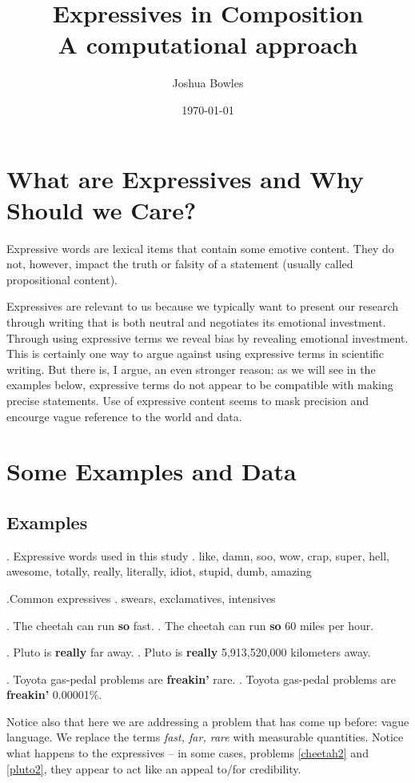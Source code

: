 \documentclass[11pt,twoside]{article}
\begin{document}
\author{Joshua Bowles}
\title{Expressives in Composition\\ \small A computational approach}
\date{\today}

\maketitle
\section{What are Expressives and Why Should we Care?}
Expressive words are lexical items that contain some emotive content. They do not, however, impact the truth or falsity of a statement (usually called propositional content).  

Expressives are relevant to us because we typically want to present our research through writing that is both neutral and negotiates its emotional investment. Through using expressive terms we reveal bias by revealing emotional investment. This is certainly one way to argue against using expressive terms in scientific writing. But there is, I argue, an even stronger reason: as we will see in the examples below, expressive terms do not appear to be compatible with making precise statements. Use of expressive content seems to mask precision and encourge vague reference to the world and data.   

\section{Some Examples and Data}
\subsection{Examples}
\ex. Expressive words used in this study 
\a. like, damn, soo, wow, crap, super, hell, awesome, totally, really, literally, idiot, stupid, dumb, amazing\label{exp}

\ex.Common expressives
\a. swears, exclamatives, intensives

\ex. The cheetah can run {\bf so} fast.
\a. The cheetah can run {\bf so} 60 miles per hour.\label{cheetah2}

\ex. Pluto is {\bf really} far away.
\a. Pluto is {\bf really} 5,913,520,000 kilometers away.\label{pluto2} 

\ex. Toyota gas-pedal problems are {\bf freakin'} rare.
\a. Toyota gas-pedal problems are {\bf freakin'} 0.00001\%. 

Notice also that here we are addressing a problem that has come up before: vague language. We replace the terms \textsl{fast, far, rare} with measurable quantities. Notice what happens to the expressives -- in some cases, problems \ref{cheetah2} and \ref{pluto2}, they appear to act like an appeal to/for credibility.
\end{document}
